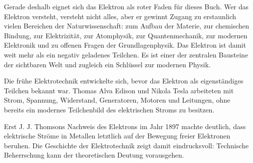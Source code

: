 Gerade deshalb eignet sich das Elektron als roter Faden für dieses Buch. Wer das Elektron versteht,
versteht nicht alles, aber er gewinnt Zugang zu erstaunlich vielen Bereichen der Naturwissenschaft:
zum Aufbau der Materie, zur chemischen Bindung, zur Elektrizität, zur Atomphysik, zur
Quantenmechanik, zur modernen Elektronik und zu offenen Fragen der Grundlagenphysik.
Das Elektron ist damit weit mehr als ein negativ geladenes Teilchen. Es ist einer der zentralen
Bausteine der sichtbaren Welt und zugleich ein Schlüssel zur modernen Physik.
\begin{HistoryBox}
	\label{:strom_Elektron}
	Die frühe Elektrotechnik entwickelte sich, bevor das Elektron als eigenständiges Teilchen
	bekannt war. Thomas Alva Edison und Nikola Tesla arbeiteten mit Strom, Spannung,
	Widerstand, Generatoren, Motoren und Leitungen, ohne bereits ein modernes Teilchenbild
	des elektrischen Stroms zu besitzen.
	
	Erst J. J. Thomsons Nachweis des Elektrons im Jahr 1897 machte deutlich, dass elektrische
	Ströme in Metallen letztlich auf der Bewegung freier Elektronen beruhen. Die Geschichte der
	Elektrotechnik zeigt damit eindrucksvoll: Technische Beherrschung kann der theoretischen
	Deutung vorausgehen.
\end{HistoryBox}